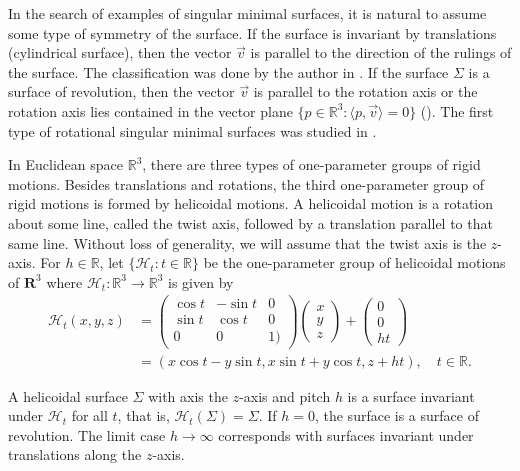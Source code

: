 \documentclass[a4paper,12pt]{amsart}
\theoremstyle{definition}
\def\r{\mathbb R}
\begin{document}
In the search of examples of singular minimal surfaces, it is natural to assume some type of symmetry of the surface. If the surface is invariant by translations (cylindrical surface), then the vector $\vec{v}$ is parallel to the direction of the rulings of the surface. The classification was done by the author in   \cite{lo}. If the surface $\Sigma$ is a surface of revolution, then the vector $\vec{v}$ is parallel to the rotation axis or  the rotation axis    lies contained in the vector plane $\{p\in\r^3\colon\langle p,\vec{v}\rangle=0\}$ (\cite{lo}). The first type of  rotational singular minimal surfaces was studied in \cite{d1,d2,d3,dg,lo}.      

In Euclidean space $\r^3$, there are three types of one-parameter groups of rigid motions. Besides translations and rotations, the third one-parameter group of rigid motions is formed by helicoidal motions. A helicoidal motion is  a rotation about some line, called the   twist axis, followed by a translation parallel to that same line. Without loss of generality, we will assume that the twist axis is the $z$-axis.  
 For $h \in\r$, let $\{\mathcal{H}_t\colon t\in\r\}$ be   the one-parameter group of helicoidal motions  of $\mathbf R^3$ where $\mathcal{H}_t\colon\r^3\to\r^3$ is given by 
\begin{equation*}
\begin{split}
\mathcal{H}_t(x,y,z) &= \begin{pmatrix}\cos t&-\sin t &0\\ \sin t&\cos t&0\\ 0&0&1)\end{pmatrix}\begin{pmatrix} x\\ y\\ z\end{pmatrix}+\begin{pmatrix}0\\ 0\\ h t\end{pmatrix}\\
&=(x\cos t - y\sin t, x \sin t + y \cos t, z+ht), \quad t \in \r.
\end{split}
\end{equation*}

  
  
  A  helicoidal surface $\Sigma$ with axis the $z$-axis and pitch $h$  is a surface   invariant under $\mathcal{H}_t$ for all $t$, that is, $\mathcal{H}_t(\Sigma)=\Sigma$. If $h=0$, the surface is a  surface of revolution.  The limit case  $h\rightarrow \infty$ corresponds with   surfaces invariant under translations along the $z$-axis.  
 
\end{document}
